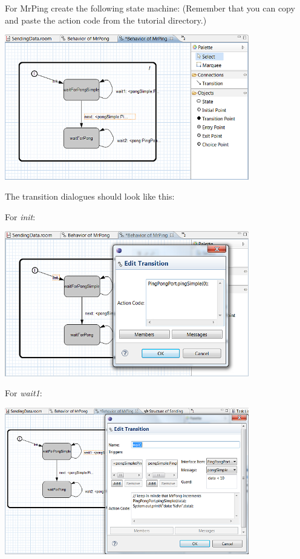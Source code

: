 For MrPing create the following state machine:
(Remember that you can copy and paste the action code from the tutorial directory.)

\includegraphics[width=0.8\textwidth]{images/025-SendingData08.png}

The transition dialogues should look like this:

For \textit{init}:

\includegraphics[width=0.8\textwidth]{images/025-SendingData09.png}

For \textit{wait1}:

\includegraphics[width=0.8\textwidth]{images/025-SendingData10.png}

